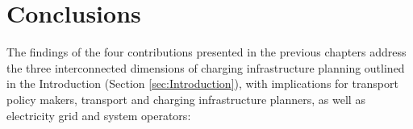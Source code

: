 \chapter{Conclusions}\label{ch:conclusion}

The findings of the four contributions presented in the previous chapters address the three interconnected dimensions of charging infrastructure planning outlined in the Introduction (Section \ref{sec:Introduction}), with implications for transport policy makers, transport and charging infrastructure planners, as well as electricity grid and system operators: 


